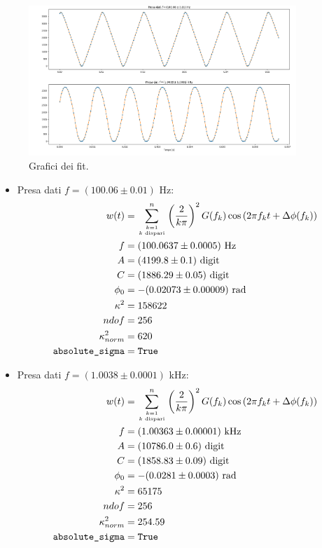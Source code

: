 \documentclass{article}[a4paper, oneside,11pt]
\begin{document}
    \begin{figure}[H]
        \centering
        \includegraphics[width=0.9\textwidth]{img/Fit-T.png}
        \caption{Grafici dei fit.}
    \end{figure}

        \begin{itemize}
        \item Presa dati $f=(100.06\pm0.01)$ Hz:
        \begin{align*}
            w(t) &= \sum_{{k=1}\atop{k \text{ dispari}}}^n \left(\frac{2}{k\pi}\right)^2 G(f_k) \cos\left(2\pi f_k t + \Delta\phi(f_k)\right)\\
            f &=  (100.0637 \pm 0.0005) \text{ Hz}\\
            A &=  (4199.8 \pm 0.1) \text{ digit} \\
            C &=  (1886.29 \pm 0.05) \text{ digit} \\
            \phi_0 &=  -(0.02073 \pm 0.00009) \text{ rad} \\
            \kappa^2 &=  158622 \\
            ndof &=  256 \\
            \kappa^2_{norm} &= 620\\
            \texttt{absolute\_sigma} &= \texttt{True}
        \end{align*}
            
        \item Presa dati $f=(1.0038\pm0.0001)$ kHz:
        \begin{align*}
            w(t) &= \sum_{{k=1}\atop{k \text{ dispari}}}^n \left(\frac{2}{k\pi}\right)^2 G(f_k) \cos\left(2\pi f_k t + \Delta\phi(f_k)\right)\\
            f &=  (1.00363 \pm 0.00001) \text{ kHz} \\
            A &=  (10786.0 \pm 0.6)\text{ digit} \\
            C &=  (1858.83 \pm 0.09) \text{ digit} \\
            \phi_0 &=  -(0.0281 \pm 0.0003) \text{ rad} \\
            \kappa^2 &=  65175\\
            ndof &=  256 \\
            \kappa^2_{norm} &= 254.59\\
            \texttt{absolute\_sigma} &= \texttt{True}
        \end{align*}
    \end{itemize}
\end{document}
